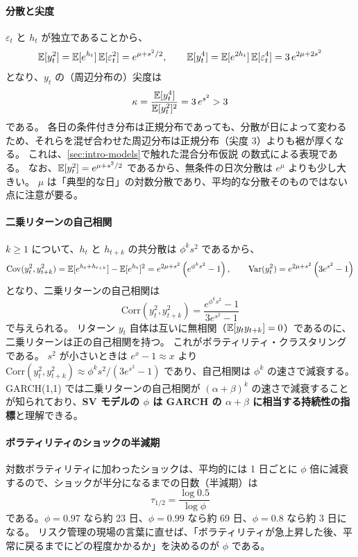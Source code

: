 \paragraph{分散と尖度}
$\varepsilon_t$ と $h_t$ が独立であることから、
\[
  \mathbb{E}[y_t^2] = \mathbb{E}[e^{h_t}]\,\mathbb{E}[\varepsilon_t^2] = e^{\mu + s^2/2}, \qquad
  \mathbb{E}[y_t^4] = \mathbb{E}[e^{2h_t}]\,\mathbb{E}[\varepsilon_t^4] = 3\,e^{2\mu + 2s^2}
\]
となり、$y_t$ の（周辺分布の）尖度は
\begin{equation}
  \kappa = \frac{\mathbb{E}[y_t^4]}{\mathbb{E}[y_t^2]^2} = 3\,e^{s^2} > 3
  \label{eq:sv-kurtosis}
\end{equation}
である。
各日の条件付き分布は正規分布であっても、分散が日によって変わるため、それらを混ぜ合わせた周辺分布は正規分布（尖度 3）よりも裾が厚くなる。
これは、\cref{sec:intro-models}で触れた混合分布仮説 \parencite{clark1973} の数式による表現である。
なお、$\mathbb{E}[y_t^2] = e^{\mu + s^2/2}$ であるから、無条件の日次分散は $e^{\mu}$ よりも少し大きい。
$\mu$ は「典型的な日」の対数分散であり、平均的な分散そのものではない点に注意が要る。

\paragraph{二乗リターンの自己相関}
$k \geq 1$ について、$h_t$ と $h_{t+k}$ の共分散は $\phi^k s^2$ であるから、
\[
  \mathrm{Cov}(y_t^2, y_{t+k}^2) = \mathbb{E}[e^{h_t + h_{t+k}}] - \mathbb{E}[e^{h_t}]^2 = e^{2\mu + s^2}\left(e^{\phi^k s^2} - 1\right),
  \qquad
  \mathrm{Var}(y_t^2) = e^{2\mu + s^2}\left(3 e^{s^2} - 1\right)
\]
となり、二乗リターンの自己相関は
\begin{equation}
  \mathrm{Corr}(y_t^2, y_{t+k}^2) = \frac{e^{\phi^k s^2} - 1}{3 e^{s^2} - 1}
  \label{eq:sv-acf}
\end{equation}
で与えられる。
リターン $y_t$ 自体は互いに無相関（$\mathbb{E}[y_t y_{t+k}] = 0$）であるのに、二乗リターンは正の自己相関を持つ。
これがボラティリティ・クラスタリングである。
$s^2$ が小さいときは $e^{x} - 1 \approx x$ より $\mathrm{Corr}(y_t^2, y_{t+k}^2) \approx \phi^k s^2 / (3e^{s^2} - 1)$ であり、自己相関は $\phi^k$ の速さで減衰する。
GARCH(1,1) では二乗リターンの自己相関が $(\alpha + \beta)^k$ の速さで減衰することが知られており、\textbf{SV モデルの $\phi$ は GARCH の $\alpha + \beta$ に相当する持続性の指標}と理解できる。

\paragraph{ボラティリティのショックの半減期}
対数ボラティリティに加わったショックは、平均的には 1 日ごとに $\phi$ 倍に減衰するので、ショックが半分になるまでの日数（半減期）は
\[
  \tau_{1/2} = \frac{\log 0.5}{\log \phi}
\]
である。$\phi = 0.97$ なら約 23 日、$\phi = 0.99$ なら約 69 日、$\phi = 0.8$ なら約 3 日になる。
リスク管理の現場の言葉に直せば、「ボラティリティが急上昇した後、平常に戻るまでにどの程度かかるか」を決めるのが $\phi$ である。

